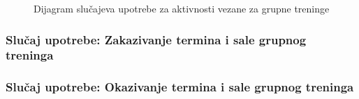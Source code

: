 \documentclass[../main.tex]{subfiles}
\begin{document}
\begin{figure}[!ht]
\begin{center}
\end{center}
\caption{Dijagram slučajeva upotrebe za aktivnosti vezane za grupne treninge}
\label{fig:kontekst}
\end{figure}

\newpage

\subsubsection{Slučaj upotrebe: Zakazivanje termina i sale grupnog treninga}


\subsubsection{Slučaj upotrebe: Okazivanje termina i sale grupnog treninga}








\end{document}
